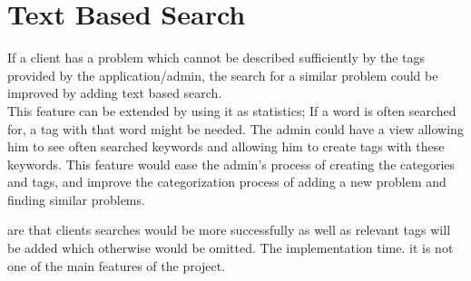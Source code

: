 \section{Text Based Search}
\label{sec:text_based_search}
If a client has a problem which cannot be described sufficiently by the tags provided by the application/admin, the search for a similar problem could be improved by adding text based search. \\
This feature can be extended by using it as statistics; If a word is often searched for, a tag with that word might be needed. 
The admin could have a view allowing him to see often searched keywords and allowing him to create tags with these keywords.
This feature would ease the admin's process of creating the categories and tags, and improve the categorization process of adding a new problem and finding similar problems.

 are that clients searches would be more successfully as well as relevant tags will be added which otherwise would be omitted.
 The implementation time.
 it is not one of the main features of the project. 